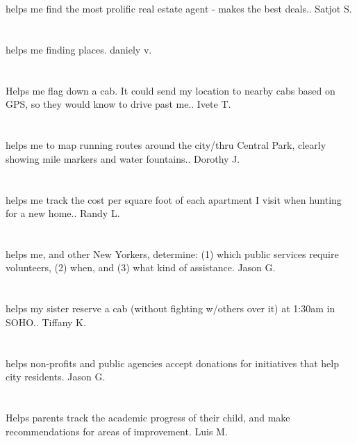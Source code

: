 \section{}helps me find the most prolific real estate agent - makes the best deals.. Satjot S.
\section{}helps me finding places. daniely v.
\section{}Helps me flag down a cab. It could send my location to nearby cabs based on GPS,  so they would know to drive past me.. Ivete T.
\section{}helps me to map running routes around the city/thru Central Park,  clearly showing mile markers and water fountains.. Dorothy J.
\section{}helps me track the cost per square foot of each apartment I visit when hunting for a new home.. Randy L.
\section{}helps me,  and other New Yorkers,  determine: (1) which public services require volunteers,  (2) when,  and (3) what kind of assistance. Jason G.
\section{}helps my sister reserve a cab (without fighting w/others over it) at 1:30am in SOHO.. Tiffany K.
\section{}helps non-profits and public agencies accept donations for initiatives that help city residents. Jason G.
\section{}Helps parents track the academic progress of their child,  and make recommendations for areas of improvement. Luis M.
